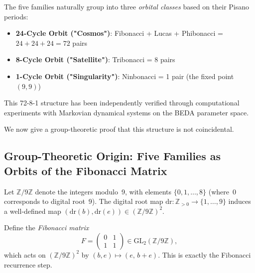 \documentclass[12pt]{article}
\begin{document}
The five families naturally group into three \emph{orbital classes} based on their Pisano periods:

\begin{itemize}
\item \textbf{24-Cycle Orbit ("Cosmos")}: Fibonacci + Lucas + Phibonacci = $24 + 24 + 24 = 72$ pairs
\item \textbf{8-Cycle Orbit ("Satellite")}: Tribonacci = 8 pairs
\item \textbf{1-Cycle Orbit ("Singularity")}: Ninbonacci = 1 pair (the fixed point $(9,9)$)
\end{itemize}

This 72-8-1 structure has been independently verified through computational experiments with Markovian dynamical systems on the BEDA parameter space.

We now give a group-theoretic proof that this structure is not coincidental.

\subsection{Group-Theoretic Origin: Five Families as Orbits of the Fibonacci Matrix}

Let $\mathbb{Z}/9\mathbb{Z}$ denote the integers modulo~9, with elements $\{0,1,\ldots,8\}$ (where~$0$ corresponds to digital root~9).  The digital root map $\mathrm{dr}:\mathbb{Z}_{>0}\to\{1,\ldots,9\}$ induces a well-defined map $(\mathrm{dr}(b),\mathrm{dr}(e))\in(\mathbb{Z}/9\mathbb{Z})^2$.

Define the \emph{Fibonacci matrix}
\[
  F = \begin{pmatrix} 0 & 1 \\ 1 & 1 \end{pmatrix} \in \mathrm{GL}_2(\mathbb{Z}/9\mathbb{Z}),
\]
which acts on $(\mathbb{Z}/9\mathbb{Z})^2$ by $(b,e)\mapsto (e,\, b+e)$.  This is exactly the Fibonacci recurrence step.
\end{document}
